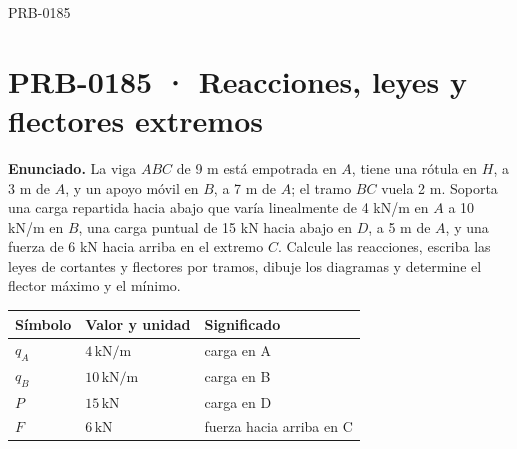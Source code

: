 \begin{studiumworked}{PRB-0185}

\section{PRB-0185 · Reacciones, leyes y flectores extremos}

\textbf{Enunciado.} La viga $A B C$ de 9 m está empotrada en $A$, tiene una rótula en $H$, a 3 m de $A$, y un apoyo móvil en $B$, a 7 m de $A$; el tramo $BC$ vuela 2 m. Soporta una carga repartida hacia abajo que varía linealmente de 4 kN/m en $A$ a 10 kN/m en $B$, una carga puntual de 15 kN hacia abajo en $D$, a 5 m de $A$, y una fuerza de 6 kN hacia arriba en el extremo $C$. Calcule las reacciones, escriba las leyes de cortantes y flectores por tramos, dibuje los diagramas y determine el flector máximo y el mínimo.

\par\medskip\noindent\begin{tabular}{@{}p{.18\linewidth}p{.26\linewidth}p{.48\linewidth}@{}}
\toprule Símbolo & Valor y unidad & Significado\\\midrule
$q_{A}$ & $4\,\mathrm{kN/m}$ & carga en A\\
$q_{B}$ & $10\,\mathrm{kN/m}$ & carga en B\\
$P$ & $15\,\mathrm{kN}$ & carga en D\\
$F$ & $6\,\mathrm{kN}$ & fuerza hacia arriba en C\\
\bottomrule\end{tabular}\par\medskip


\end{studiumworked}
